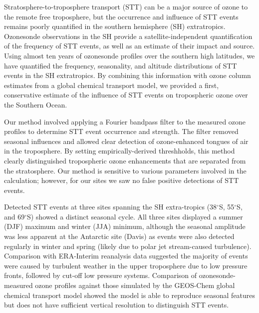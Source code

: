 \documentclass[acp, manuscript]{copernicus} %
\begin{document}
\conclusions  %
%
  
Stratosphere-to-troposphere transport (STT) can be a major source of ozone to the remote free troposphere, but the occurrence and influence of STT events remains poorly quantified in the southern hemisphere (SH) extratropics.
Ozonesonde observations in the SH provide a satellite-independent quantification of the frequency of STT events, as well as an estimate of their impact and source.
Using almost ten years of ozonesonde profiles over the southern high latitudes, we have quantified the frequency, seasonality, and altitude distributions of STT events in the SH extratropics. 
By combining this information with ozone column estimates from a global chemical transport model, we provided a first, conservative estimate of the influence of STT events on tropospheric ozone over the Southern Ocean.

Our method involved applying a Fourier bandpass filter to the measured ozone profiles to determine STT event occurrence and strength.
The filter removed seasonal influences and allowed clear detection of ozone-enhanced tongues of air in the troposphere.
By setting empirically-derived threshholds, this method clearly distinguished tropospheric ozone enhancements that are separated from the stratosphere.
Our method is sensitive to various parameters involved in the calculation; however, for our sites we saw no false positive detections of STT events.

Detected STT events at three sites spanning the SH extra-tropics (38$^{\circ}$S, 55$^{\circ}$S, and 69$^{\circ}$S) showed a distinct seasonal cycle.
All three sites displayed a summer (DJF) maximum and winter (JJA) minimum, although the seasonal amplitude was less apparent at the Antarctic site (Davis) as events were also detected regularly in winter and spring (likely due to polar jet stream-caused turbulence).  %
Comparison with ERA-Interim reanalysis data suggested the majority of events were caused by turbulent weather in the upper troposphere due to low pressure fronts, followed by cut-off low pressure systems.
Comparison of ozonesonde-measured ozone profiles against those simulated by the GEOS-Chem global chemical transport model showed the model is able to reproduce seasonal features but does not have sufficient vertical resolution to distinguish STT events.
\end{document}
